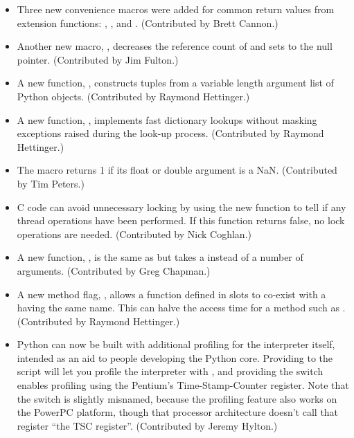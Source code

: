 \documentclass{howto}
\begin{document}
\begin{itemize}

  \item Three new convenience macros were added for common return
  values from extension functions: ,
  , and .
  (Contributed by Brett Cannon.)

  \item Another new macro, , 
  decreases the reference count of  and sets  to the
  null pointer.  (Contributed by Jim Fulton.)

  \item A new function, , constructs tuples from a variable
  length argument list of Python objects.  (Contributed by Raymond Hettinger.)

  \item A new function, ,
  implements fast dictionary lookups without masking exceptions raised
  during the look-up process.  (Contributed by Raymond Hettinger.)

  \item The  macro returns 1 if 
  its float or double argument  is a NaN.  
  (Contributed by Tim Peters.)

  \item C code can avoid unnecessary locking by using the new
    function to tell 
   if any thread operations have been performed.  If this function 
   returns false, no lock operations are needed.
   (Contributed by Nick Coghlan.)

  \item A new function, ,
  is the same as  but takes a 
   instead of a number of arguments.
  (Contributed by Greg Chapman.)

  \item A new method flag, , allows a function
  defined in slots to co-exist with a  having the
  same name.  This can halve the access time for a method such as
  .  (Contributed by Raymond Hettinger.)

  \item Python can now be built with additional profiling for the
  interpreter itself, intended as an aid to people developing the
  Python core.  Providing  to the
   script will let you profile the interpreter with
  , and providing the 
  switch enables profiling using the Pentium's Time-Stamp-Counter
  register.  Note that the  switch is slightly
  misnamed, because the profiling feature also works on the PowerPC
  platform, though that processor architecture doesn't call that
  register ``the TSC register''.  (Contributed by Jeremy Hylton.)
    

\end{itemize}
\end{document}
